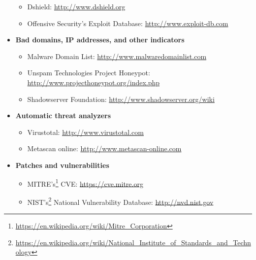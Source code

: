 \begin{itemize}
\begin{itemize}
            \item Dshield: 
            \url{http://www.dshield.org}
            
            \item Offensive Security’s Exploit Database: \url{http://www.exploit-db.com} 
            
        \end{itemize}
    
    \item \textbf{Bad domains, IP addresses, and other indicators} 
        \begin{itemize}
            \item Malware Domain List: 
            \url{http://www.malwaredomainlist.com}
            
            \item Unspam Technologies Project Honeypot: 
            \url{http://www.projecthoneypot.org/index.php}
            
            \item Shadowserver Foundation: 
            \url {http://www.shadowserver.org/wiki} 
            
        \end{itemize}
        
    \item \textbf{Automatic threat analyzers }
        \begin{itemize}
            \item Virustotal: 
            \url{http://www.virustotal.com}
            
            \item Metascan online: 
            \url{http://www.metascan-online.com}
            
        \end{itemize}
        
    \item \textbf{Patches and vulnerabilities} 
            \begin{itemize}
            \item MITRE’s\footnote{\url{https://en.wikipedia.org/wiki/Mitre_Corporation}} CVE: 
            \url{https://cve.mitre.org}
            
            \item NIST’s\footnote{\url{https://en.wikipedia.org/wiki/National_Institute_of_Standards_and_Technology}} National Vulnerability Database: 
            \url{http://nvd.nist.gov}
        \end{itemize}
        
\end{itemize}

